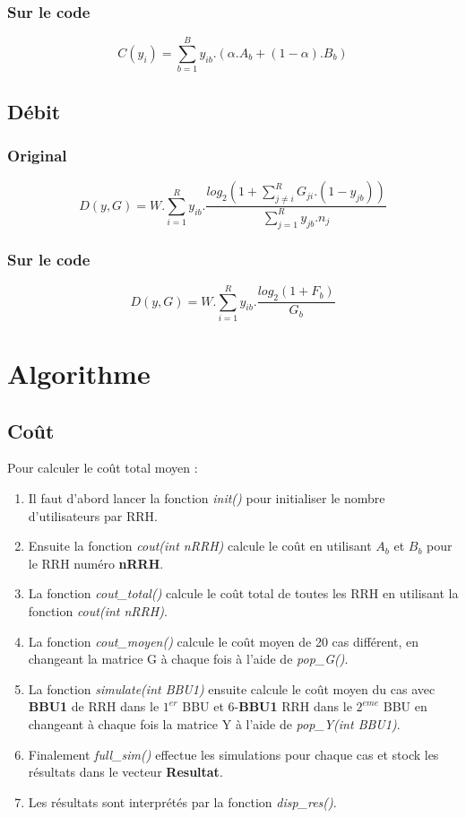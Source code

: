 \documentclass[a4paper,sans,titlepage,10pt]{article}
\begin{document}
\subsubsection{Sur le code}
\begin{displaymath}
C(y_i)= \sum\limits_{b=1}^By_{ib}.(\alpha.A_b+(1-\alpha).B_b)
\end{displaymath}
\subsection{Débit}
\subsubsection{Original}
\begin{displaymath}
D(y,G)=W.\sum\limits_{i=1}^Ry_{ib}.\frac{log_2\left(1+\sum\limits_{j \neq i}^RG_{ji}.(1-y_{jb})\right)}{\sum\limits_{j=1}^Ry_{jb}.n_j}
\end{displaymath}
\subsubsection{Sur le code}
\begin{displaymath}
D(y,G)=W.\sum\limits_{i=1}^Ry_{ib}.\frac{log_2(1+F_b)}{G_b}
\end{displaymath}
\section{Algorithme}
\subsection{Coût}
Pour calculer le coût total moyen :
\begin{enumerate}
\item Il faut d'abord lancer la fonction \textit{init()} pour initialiser le nombre d'utilisateurs par RRH.
\item Ensuite la fonction \textit{cout(int nRRH)} calcule le coût en utilisant $A_b$ et 
$B_b$ pour le RRH numéro \textbf{nRRH}.
\item La fonction \textit{cout\_total()} calcule le coût total de toutes les RRH en utilisant la fonction \textit{cout(int nRRH)}.
\item La fonction \textit{cout\_moyen()} calcule le coût moyen de 20 cas différent, en changeant la matrice G à chaque fois à l'aide de \textit{pop\_G()}.
\item La fonction \textit{simulate(int BBU1)} ensuite calcule le coût moyen du cas avec \textbf{BBU1} de RRH dans le $1^{er}$ BBU et 6-\textbf{BBU1} RRH dans le $2^{eme}$ BBU
en changeant à chaque fois la matrice Y à l'aide de \textit{pop\_Y(int BBU1)}.
\item Finalement \textit{full\_sim()} effectue les simulations pour chaque cas et stock 
les résultats dans le vecteur \textbf{Resultat}.
\item Les résultats sont interprétés par la fonction \textit{disp\_res()}.
\end{enumerate} 
\end{document}
